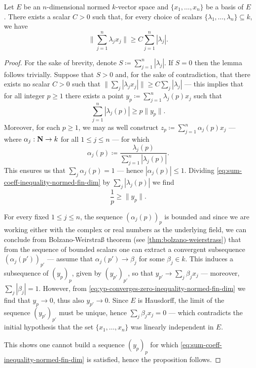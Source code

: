 \begin{lemma}
    \label{lem:finite-normed-scalars-inequality}
    Let \(E\) be an \(n\)-dimensional normed \(k\)-vector space and \(\{x_1, \dots,
    x_n\}\) be a basis of \(E\). There exists a scalar \(C > 0\) such that, for
    every choice of scalars \(\{\lambda_1, \dots, \lambda_n\} \subseteq k\), we have
    \[
        \bigg\| \sum_{j=1}^n \lambda_j x_j \bigg\| \geq C \sum_{j=1}^n |\lambda_j|.
    \]
\end{lemma}

\begin{proof}
    For the sake of brevity, denote \(S \coloneq \sum_{j=1}^{n} |\lambda_j|\). If
    \(S = 0\) then the lemma follows trivially. Suppose that \(S > 0\) and, for the
    sake of contradiction, that there exists no scalar \(C > 0\) such that \(\|
    \sum_j | \lambda_j x_j | \| \geq C \sum_j |\lambda_j|\) --- this implies that
    for all integer \(p \geq 1\) there exists a point \(y_p \coloneq \sum_{j=1}^n
    \lambda_j(p) x_j\) such that
    \begin{equation}\label{eq:sum-coeff-inequality-normed-fin-dim}
        \sum_{j=1}^n |\lambda_j(p)| \geq p \| y_p \|.
    \end{equation}
    Moreover, for each \(p \geq 1\), we may as well construct \(z_p \coloneq
    \sum_{j=1}^n \alpha_j(p) x_j\) --- where \(\alpha_j: \mathbf{N} \to k\) for all \(1 \leq
    j \leq n\) --- for which
    \[
        \alpha_j(p) \coloneq \frac{\lambda_j(p)}{\sum_{j=1}^n |\lambda_j(p)|}.
    \]
    This ensures us that \(\sum_j \alpha_j(p) = 1\) --- hence \(|\alpha_j(p)| \leq
    1\). Dividing \cref{eq:sum-coeff-inequality-normed-fin-dim} by \(\sum_j
    |\lambda_j(p)|\) we find
    \begin{equation}\label{eq:yp-converges-zero-inequality-normed-fin-dim}
        \frac 1 p \geq \| y_p \|.
    \end{equation}

    For every fixed \(1 \leq j \leq n\), the sequence \((\alpha_j(p))_p\) is bounded
    and since we are working either with the complex or real numbers as the
    underlying field, we can conclude from Bolzano-Weirstra{\ss} theorem (see
    \cref{thm:bolzano-weierstrass}) that from the sequence of bounded scalars one
    can extract a convergent subsequence \((\alpha_j(p'))_{p'}\) --- assume that
    \(\alpha_j(p') \to \beta_j\) for some \(\beta_j \in k\). This induces a
    subsequence of \((y_p)_{p}\), given by \((y_{p'})_{p'}\), so that \(y_{p'} \to
    \sum_j \beta_j x_j\) --- moreover, \(\sum_j |\beta_j| = 1\). However, from
    \cref{eq:yp-converges-zero-inequality-normed-fin-dim} we find that \(y_p \to
    0\), thus also \(y_{p'} \to 0\). Since \(E\) is Hausdorff, the limit of the
    sequence \((y_{p'})_{p'}\) must be unique, hence \(\sum_j \beta_j x_j = 0\)
    --- which contradicts the initial hypothesis that the set \(\{x_1, \dots,
    x_n\}\) was linearly independent in \(E\).

    This shows one cannot build a sequence \((y_p)_p\) for which
    \cref{eq:sum-coeff-inequality-normed-fin-dim} is satisfied, hence the
    proposition follows.
\end{proof}

